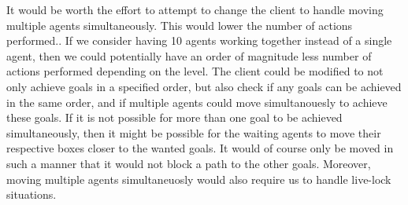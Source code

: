 It would be worth the effort to attempt to change the client to handle moving multiple agents simultaneously.
This would lower the number of actions performed..
If we consider having 10 agents working together instead of a single agent, then we could potentially have an order of magnitude less number of actions performed depending on the level.
The client could be modified to not only achieve goals in a specified order, but also check if any goals can be achieved in the same order, and if multiple agents could move simultanouesly to achieve these goals.
If it is not possible for more than one goal to be achieved simultaneously, then it might be possible for the waiting agents to move their respective boxes closer to the wanted goals.
It would of course only be moved in such a manner that it would not block a path to the other goals.
Moreover, moving multiple agents simultaneuosly would also require us to handle live-lock situations.
